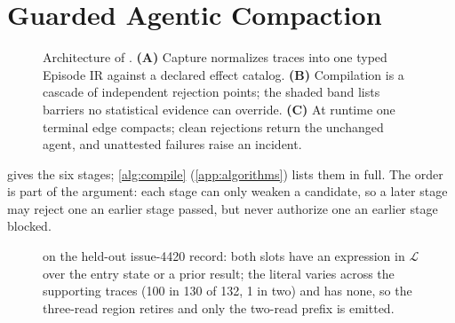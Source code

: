 \section{Guarded Agentic Compaction}
\label{sec:method}

\begin{figure}[t]
  \centering
  
  \caption{Architecture of \method. \textbf{(A)} Capture normalizes traces into
one typed Episode IR against a declared effect catalog. \textbf{(B)} Compilation
is a cascade of independent rejection points; the shaded band lists barriers no
statistical evidence can override. \textbf{(C)} At runtime one terminal edge
compacts; clean rejections return the unchanged agent, and unattested failures
raise an incident.}
  \label{fig:pipeline}
\end{figure}

 gives the six stages; \cref{alg:compile}
(\cref{app:algorithms}) lists them in full. The order is part of the argument: each stage can only weaken
a candidate, so a later stage may reject one an earlier stage passed, but never
authorize one an earlier stage blocked.

\begin{figure}[t]
  \centering
  
  \caption{ on the held-out issue-4420 record: both
   slots have an expression in $\mathcal{L}$ over the entry
  state or a prior result; the  literal varies across the
  supporting traces (100 in 130 of 132, 1 in two) and has none, so the
  three-read region retires and only the two-read prefix is emitted.}
  \label{fig:provenance}
\end{figure}

